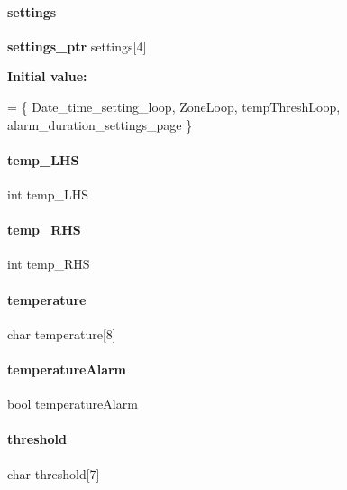 \paragraph{settings}
{\footnotesize\ttfamily \textbf{ settings\+\_\+ptr} settings[4]}

{\bfseries Initial value\+:}
\begin{DoxyCode}
= \{
                            Date_time_setting_loop,
                            ZoneLoop, tempThreshLoop,
                            alarm_duration_settings_page
\}
\end{DoxyCode}
\mbox{\label{a00038_addfbe952b825ea116a2e601f08703759}} 
\paragraph{temp\+\_\+\+L\+HS}
{\footnotesize\ttfamily int temp\+\_\+\+L\+HS}

\mbox{\label{a00038_ad703226793daed4d0a856d5e2c9ebfee}} 
\paragraph{temp\+\_\+\+R\+HS}
{\footnotesize\ttfamily int temp\+\_\+\+R\+HS}

\mbox{\label{a00038_a220174992ee28a3acbed1ddf9c887ddd}} 
\paragraph{temperature}
{\footnotesize\ttfamily char temperature[8]}

\mbox{\label{a00038_ac27797d8a2dc3cbb89f4c80502b4d0b2}} 
\paragraph{temperature\+Alarm}
{\footnotesize\ttfamily bool temperature\+Alarm}

\mbox{\label{a00038_adc70276b5fdc17a08b73d4b81bd71990}} 
\paragraph{threshold}
{\footnotesize\ttfamily char threshold[7]}

